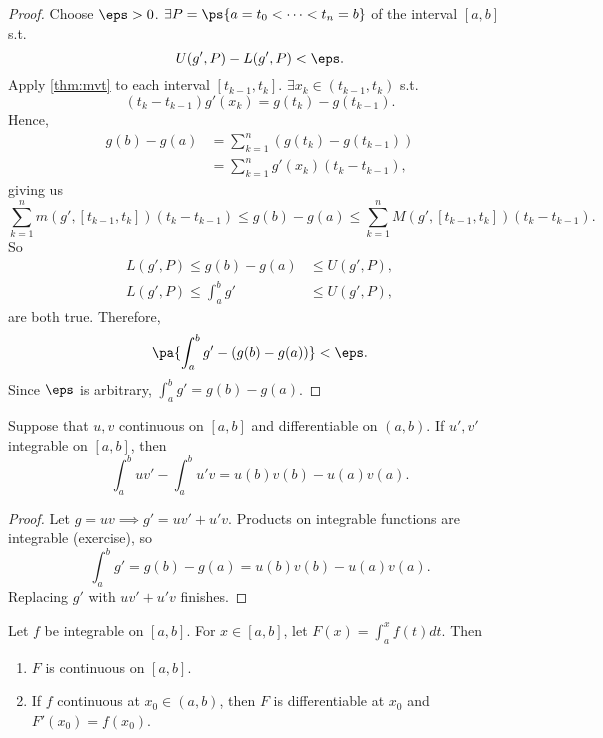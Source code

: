 \documentclass[11pt]{scrartcl}
\numberwithin{equation}{section}
\begin{document}
\begin{proof}
    Choose $\eps>0$. $\exists P=\ps{a=t_0<\cdots<t_n=b}$ of the interval 
    $[a,b]$ s.t. 
    \[
        U(g',P) - L(g',P) < \eps.
    \]
    Apply \cref{thm:mvt} to each interval $[t_{k-1},t_k]$.
    $\exists x_k\in (t_{k-1}, t_k)$ s.t. 
    \[
        (t_k-t_{k-1})g'(x_k) = g(t_k) - g(t_{k-1}).
    \]
    Hence, 
    \begin{align*}
        g(b)-g(a) &= \sum_{k=1}^{n}(g(t_k) - g(t_{k-1})) \\
        &= \sum_{k=1}^{n}g'(x_k)(t_k-t_{k-1}),
    \end{align*}
    giving us 
    \[
        \sum_{k=1}^{n}m(g',[t_{k-1}, t_k])(t_k-t_{k-1}) \leq g(b)-g(a) \leq \sum_{k=1}^{n}M(g',[t_{k-1}, t_k])(t_k-t_{k-1}).
    \]
    So
    \begin{align*}
        L(g',P) \leq g(b)-g(a) &\leq  U(g',P), \\
        L(g',P) \leq \int_{a}^{b}g' &\leq  U(g',P),
    \end{align*}
    are both true. 
    Therefore, 
    \[
        \pa{\int_{a}^{b}g' - (g(b)-g(a))} < \eps.
    \]
    Since $\eps$ is arbitrary, $\int_{a}^{b}g'=g(b)-g(a)$.
\end{proof}

\begin{theorem}
    \label{thm:intbyparts}
    Suppose that $u,v$ continuous on $[a,b]$ and differentiable on $(a,b)$.
    If $u', v'$ integrable on $[a,b]$, then 
    \[
        \int_{a}^{b}uv' - \int_{a}^{b}u'v = 
        u(b)v(b)-u(a)v(a).
    \]
\end{theorem}

\begin{proof}
    Let $g=uv \implies g'=uv'+u'v$. Products on integrable functions 
    are integrable (exercise), so 
    \[
        \int_{a}^{b}g' = g(b)-g(a) = u(b)v(b) - u(a)v(a).
    \]
    Replacing $g'$ with $uv'+u'v$ finishes.
\end{proof}

\begin{theorem}
    \label{thm:fundthmcalc2}
    Let $f$ be integrable on $[a,b]$. For $x\in[a,b]$, let 
    $F(x) = \int_{a}^{x}f(t)dt$. Then 
    \begin{enumerate}
        \item $F$ is continuous on $[a,b]$.
        \item If $f$ continuous at $x_0\in(a,b)$, then $F$ is differentiable 
        at $x_0$ and $F'(x_0) = f(x_0)$.
    \end{enumerate}
\end{theorem}
\end{document}

